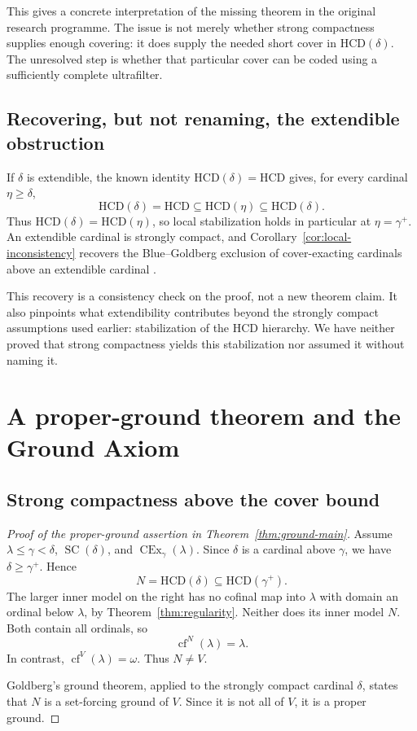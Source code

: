 \documentclass[11pt,letterpaper]{article}
\theoremstyle{definition}
\newcommand{\SC}{\operatorname{SC}}
\newcommand{\CEx}{\operatorname{CEx}}
\newcommand{\cf}{\operatorname{cf}}
\newcommand{\HCD}{\mathrm{HCD}}
\begin{document}
This gives a concrete interpretation of the missing theorem in the original research programme. The issue is not merely whether strong compactness supplies enough covering: it does supply the needed short cover in $\HCD(\delta)$. The unresolved step is whether that particular cover can be coded using a sufficiently complete ultrafilter.

\subsection{Recovering, but not renaming, the extendible obstruction}

If $\delta$ is extendible, the known identity $\HCD(\delta)=\HCD$ gives, for every cardinal $\eta\ge\delta$,
\[
\HCD(\delta)=\HCD\subseteq\HCD(\eta)\subseteq\HCD(\delta).
\]
Thus $\HCD(\delta)=\HCD(\eta)$, so local stabilization holds in particular at $\eta=\gamma^+$. An extendible cardinal is strongly compact, and Corollary~\ref{cor:local-inconsistency} recovers the Blue--Goldberg exclusion of cover-exacting cardinals above an extendible cardinal \cite[Theorem 3.6]{cover}.

This recovery is a consistency check on the proof, not a new theorem claim. It also pinpoints what extendibility contributes beyond the strongly compact assumptions used earlier: stabilization of the HCD hierarchy. We have neither proved that strong compactness yields this stabilization nor assumed it without naming it.

\section{A proper-ground theorem and the Ground Axiom}\label{sec:geology}

\subsection{Strong compactness above the cover bound}

\begin{proof}[Proof of the proper-ground assertion in Theorem~\ref{thm:ground-main}]
Assume $\lambda\le\gamma<\delta$, $\SC(\delta)$, and $\CEx_\gamma(\lambda)$. Since $\delta$ is a cardinal above $\gamma$, we have $\delta\ge\gamma^+$. Hence
\[
N=\HCD(\delta)\subseteq\HCD(\gamma^+).
\]
The larger inner model on the right has no cofinal map into $\lambda$ with domain an ordinal below $\lambda$, by Theorem~\ref{thm:regularity}. Neither does its inner model $N$. Both contain all ordinals, so
\[
\cf^N(\lambda)=\lambda.
\]
In contrast, $\cf^V(\lambda)=\omega$. Thus $N\ne V$.

Goldberg's ground theorem, applied to the strongly compact cardinal $\delta$, states that $N$ is a set-forcing ground of $V$. Since it is not all of $V$, it is a proper ground.
\end{proof}
\end{document}
